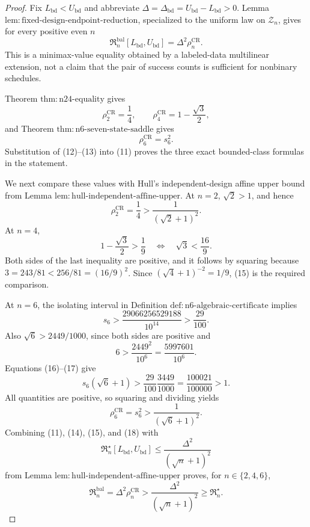 \documentclass{article}
\begin{document}
\begin{proof}
Fix \(L_{\mathrm{bd}}<U_{\mathrm{bd}}\) and abbreviate \(\Delta=\Delta_{\mathrm{bd}}=U_{\mathrm{bd}}-L_{\mathrm{bd}}>0\).  Lemma \(\mathrm{lem{:}fixed\mbox{-}design\mbox{-}endpoint\mbox{-}reduction}\), specialized to the uniform law on \(\mathcal Z_n\), gives for every positive even \(n\)
\[
 \mathfrak R_n^{\mathrm{bal}}[L_{\mathrm{bd}},U_{\mathrm{bd}}]
 =\Delta^2\rho_n^{\mathrm{CR}}. \tag{11}
\]
This is a minimax-value equality obtained by a labeled-data multilinear extension, not a claim that the pair of success counts is sufficient for nonbinary schedules.

Theorem \(\mathrm{thm{:}n24\mbox{-}equality}\) gives
\[
 \rho_2^{\mathrm{CR}}=\frac14,
 \qquad
 \rho_4^{\mathrm{CR}}=1-\frac{\sqrt3}{2}, \tag{12}
\]
and Theorem \(\mathrm{thm{:}n6\mbox{-}seven\mbox{-}state\mbox{-}saddle}\) gives
\[
 \rho_6^{\mathrm{CR}}=s_6^2. \tag{13}
\]
Substitution of (12)--(13) into (11) proves the three exact bounded-class formulas in the statement.

We next compare these values with Hull's independent-design affine upper bound from Lemma \(\mathrm{lem{:}hull\mbox{-}independent\mbox{-}affine\mbox{-}upper}\).  At \(n=2\), \(\sqrt2>1\), and hence
\[
 \rho_2^{\mathrm{CR}}=\frac14>\frac1{(\sqrt2+1)^2}. \tag{14}
\]
At \(n=4\),
\[
 1-\frac{\sqrt3}{2}>\frac19
 \quad\Longleftrightarrow\quad
 \sqrt3<\frac{16}{9}. \tag{15}
\]
Both sides of the last inequality are positive, and it follows by squaring because
\(
 3=243/81<256/81=(16/9)^2
\).  Since \((\sqrt4+1)^{-2}=1/9\), (15) is the required comparison.

At \(n=6\), the isolating interval in Definition \(\mathrm{def{:}n6\mbox{-}algebraic\mbox{-}certificate}\) implies
\[
 s_6>\frac{29066256529188}{10^{14}}>\frac{29}{100}. \tag{16}
\]
Also \(\sqrt6>2449/1000\), since both sides are positive and
\[
 6>\frac{2449^2}{10^6}=\frac{5997601}{10^6}. \tag{17}
\]
Equations (16)--(17) give
\[
 s_6(\sqrt6+1)>
 \frac{29}{100}\frac{3449}{1000}
 =\frac{100021}{100000}>1.
\]
All quantities are positive, so squaring and dividing yields
\[
 \rho_6^{\mathrm{CR}}=s_6^2>\frac1{(\sqrt6+1)^2}. \tag{18}
\]
Combining (11), (14), (15), and (18) with
\[
 \mathfrak R_n^\star[L_{\mathrm{bd}},U_{\mathrm{bd}}]
 \leq\frac{\Delta^2}{(\sqrt n+1)^2}
\]
from Lemma \(\mathrm{lem{:}hull\mbox{-}independent\mbox{-}affine\mbox{-}upper}\) proves, for \(n\in\{2,4,6\}\),
\[
 \mathfrak R_n^{\mathrm{bal}}
 =\Delta^2\rho_n^{\mathrm{CR}}
 >\frac{\Delta^2}{(\sqrt n+1)^2}
 \geq\mathfrak R_n^\star. \tag{19}
\]


\end{proof}
\end{document}
